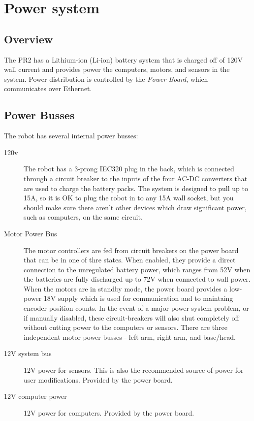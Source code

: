 \section{Power system}
\subsection{Overview}
The PR2 has a Lithium-ion (Li-ion) battery system that is charged off of 120V wall current and provides power the computers, motors, and sensors in the system.  Power distribution is controlled by the {\it Power Board}, which communicates over Ethernet.
\subsection{Power Busses}
The robot has several internal power busses:
\begin{description}
\item[120v] The robot has a 3-prong IEC320 plug in the back, which is connected through a circuit breaker to the inputs of the four AC-DC converters that are used to charge the battery packs.  The system is designed to pull up to 15A, so it is OK to plug the robot in to any 15A wall socket, but you should make sure there aren't other devices which draw significant power, such as computers, on the same circuit.
\item[Motor Power Bus] The motor controllers are fed from circuit breakers on the power board that can be in one of thre states.  When enabled, they provide a direct connection to the unregulated battery power, which ranges from 52V when the batteries are fully discharged up to 72V when connected to wall power.  When the motors are in standby mode, the power board provides a low-power 18V supply which is used for communication and to maintaing encoder position counts.  In the event of a major power-system problem, or if manually disabled, these circuit-breakers will also shut completely off without cutting power to the computers or sensors.  There are three independent motor power busses - left arm, right arm, and base/head.
\item[12V system bus]
12V power for sensors.  This is also the recommended source of power for user modifications. Provided by the power board.
\item[12V computer power]
12V power for computers.  Provided by the power board.

\end{description}
